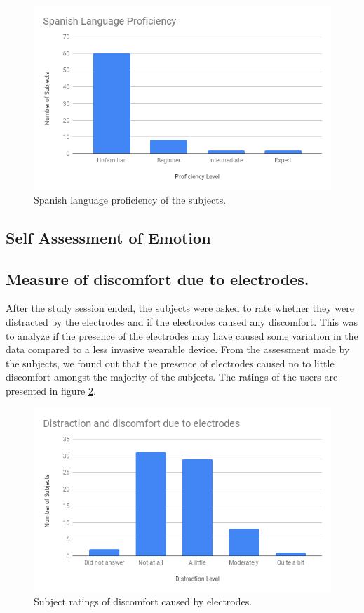 \begin{figure}
    \centering
    \includegraphics[width=140mm]{Figures/spanish_language_proficiency.png}
    \caption{Spanish language proficiency of the subjects.}
    \label{fig:spanish_language}
\end{figure}

\subsection{Self Assessment of Emotion}

\subsection{Measure of discomfort due to electrodes.}
After the study session ended, the subjects were asked to rate whether they were distracted by the electrodes and if the electrodes caused any discomfort. This was to analyze if the presence of the electrodes may have caused some variation in the data compared to a less invasive wearable device. From the assessment made by the subjects, we found out that the presence of electrodes caused no to little discomfort amongst the majority of the subjects. The ratings of the users are presented in figure \ref{fig:discomfort}.

\begin{figure}
    \centering
    \includegraphics[width=140mm]{Figures/distraction_and_discomfort.png}
    \caption{Subject ratings of discomfort caused by electrodes.}
    \label{fig:discomfort}
\end{figure}

